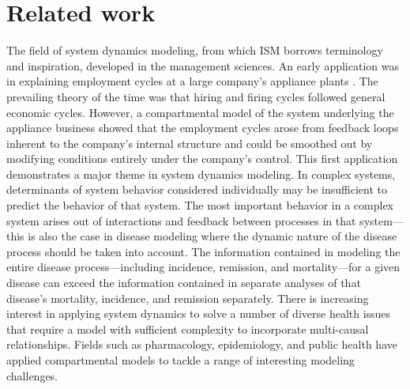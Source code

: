 \section{Related work}

The field of system dynamics modeling, from which ISM borrows terminology and
inspiration, developed in the management sciences. An early application was
in explaining employment cycles at a large company's appliance plants
\cite{Forrester_Counterintuitive_1971}. The prevailing theory of the
time was that hiring and firing cycles followed general economic
cycles. However, a compartmental model of the system underlying the
appliance business showed that the employment cycles arose from
feedback loops inherent to the company's internal structure and could be
smoothed out by modifying conditions entirely under the company's
control. This first application demonstrates a major theme in system
dynamics modeling. In complex systems, determinants of system behavior
considered individually may be insufficient to predict the behavior of
that system. The most important behavior in a complex system arises
out of interactions and feedback between processes in that
system---this is also the case in disease modeling where the dynamic
nature of the disease process should be taken into account. The
information contained in modeling the entire disease
process---including incidence, remission, and mortality---for a given
disease can exceed the information contained in separate analyses of
that disease's mortality, incidence, and remission separately. There
is increasing interest in applying system dynamics to solve a number
of diverse health issues that require a model with sufficient
complexity to incorporate multi-causal relationships. Fields such as
pharmacology, epidemiology, and public health have applied
compartmental models to tackle a range of interesting modeling
challenges.

